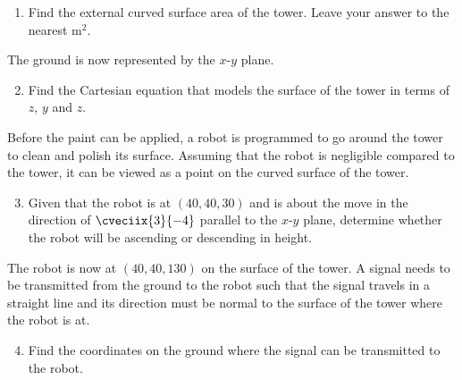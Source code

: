 \begin{problem}
    \begin{enumerate}
        \item Find the external curved surface area of the tower. Leave your answer to the nearest m$^2$.
    \end{enumerate}

    The ground is now represented by the $x$-$y$ plane.

    \begin{enumerate}
        \setcounter{enumi}{1}
        \item Find the Cartesian equation that models the surface of the tower in terms of $z$, $y$ and $z$.
    \end{enumerate}

    Before the paint can be applied, a robot is programmed to go around the tower to clean and polish its surface. Assuming that the robot is negligible compared to the tower, it can be viewed as a point on the curved surface of the tower.

    \begin{enumerate}
        \setcounter{enumi}{2}
        \item Given that the robot is at $(40, 40, 30)$ and is about the move in the direction of $\cveciix{3}{-4}$ parallel to the $x$-$y$ plane, determine whether the robot will be ascending or descending in height.
    \end{enumerate}

    The robot is now at $(40, 40, 130)$ on the surface of the tower. A signal needs to be transmitted from the ground to the robot such that the signal travels in a straight line and its direction must be normal to the surface of the tower where the robot is at.

    \begin{enumerate}
        \setcounter{enumi}{3}
        \item Find the coordinates on the ground where the signal can be transmitted to the robot.
    \end{enumerate}
\end{problem}
